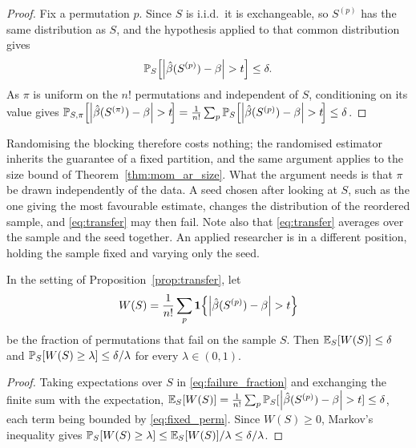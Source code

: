 \begin{proof}
    Fix a permutation $p$. Since $S$ is i.i.d.\ it is exchangeable, so $S^{(p)}$ has the same distribution as $S$, and the hypothesis applied to that common distribution gives
    \begin{equation}
    \label{eq:fixed_perm}
        \operatorname{\mathbb{P}}_S\!\left[\left|\hat{\beta}(S^{(p)})-\beta\right| > t\right] \leq \delta .
    \end{equation}
    As $\pi$ is uniform on the $n!$ permutations and independent of $S$, conditioning on its value gives $\operatorname{\mathbb{P}}_{S,\pi}\!\left[\left|\hat{\beta}(S^{(\pi)})-\beta\right| > t\!\right] = \frac{1}{n!}\sum_{p} \operatorname{\mathbb{P}}_S\!\left[\left|\hat{\beta}(S^{(p)})-\beta\right| > t\!\right] \leq \delta$.
\end{proof}

Randomising the blocking therefore costs nothing; the randomised estimator inherits the guarantee of a fixed partition, and the same argument applies to the size bound of Theorem~\ref{thm:mom_ar_size}. What the argument needs is that $\pi$ be drawn independently of the data. A seed chosen after looking at $S$, such as the one giving the most favourable estimate, changes the distribution of the reordered sample, and \eqref{eq:transfer} may then fail. Note also that \eqref{eq:transfer} averages over the sample and the seed together. An applied researcher is in a different position, holding the sample fixed and varying only the seed.

\begin{proposition}
\label{prop:conditional}
    In the setting of Proposition~\ref{prop:transfer}, let
    \begin{equation}
    \label{eq:failure_fraction}
        W(S) = \frac{1}{n!}\sum_{p} \mathbf{1}\!\left\{\left|\hat{\beta}(S^{(p)})-\beta\right| > t\right\}
    \end{equation}
    be the fraction of permutations that fail on the sample $S$. Then $\operatorname{\mathbb{E}}_S[W(S)] \leq \delta$ and $\operatorname{\mathbb{P}}_S[W(S) \geq \lambda] \leq \delta/\lambda$ for every $\lambda \in (0,1)$.
\end{proposition}

\begin{proof}
    Taking expectations over $S$ in \eqref{eq:failure_fraction} and exchanging the finite sum with the expectation, $\operatorname{\mathbb{E}}_S[W(S)] = \frac{1}{n!}\sum_{p} \operatorname{\mathbb{P}}_S[\left|\hat{\beta}(S^{(p)})-\beta\right| > t] \leq \delta$, each term being bounded by \eqref{eq:fixed_perm}. Since $W(S) \geq 0$, Markov's inequality gives $\operatorname{\mathbb{P}}_S[W(S) \geq \lambda] \leq \operatorname{\mathbb{E}}_S[W(S)]/\lambda \leq \delta/\lambda$.
\end{proof}

